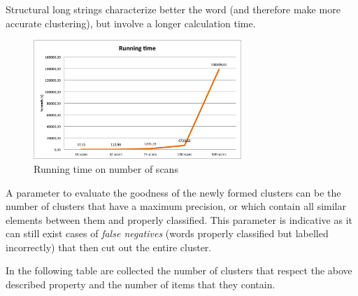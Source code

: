 Structural long strings characterize better the word (and therefore make more accurate clustering), but involve a longer calculation time.

\begin{figure}[!htbp]
\centering
\includegraphics[width=0.7\textwidth]{images/esecuzione}
\caption{Running time on number of scans}
\label{fig:time}
\end{figure}

A parameter to evaluate the goodness of the newly formed clusters can be the number of clusters that have a maximum precision, or which contain all similar elements between them and properly classified. This parameter is indicative as it can still exist cases of \emph{false negatives} (words properly classified but labelled incorrectly) that then cut out the entire cluster.

In the following table are collected the number of clusters that respect the above described property and the number of items that they contain. 

